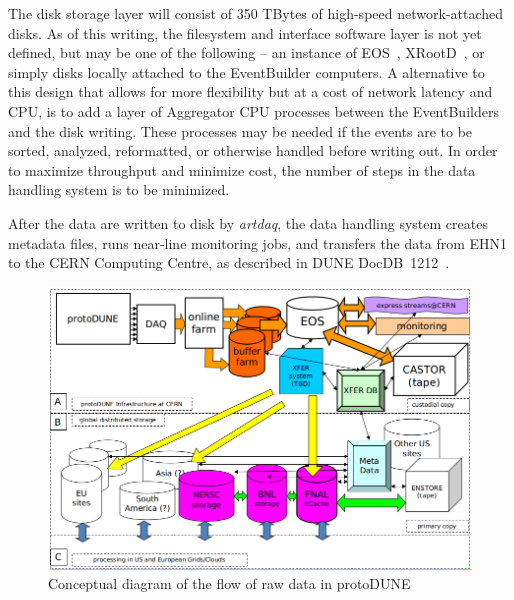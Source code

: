 The disk storage layer will consist of 350 TBytes of high-speed
network-attached disks.  As of this writing, the filesystem and
interface software layer is not yet defined, but may be one of the
following -- an instance of EOS~\cite{eos}, XRootD~\cite{xrootd}, or
simply disks locally attached to the EventBuilder computers.  A
alternative to this design that allows for more flexibility but at a
cost of network latency and CPU, is to add a layer of Aggregator CPU
processes between the EventBuilders and the disk writing.  These
processes may be needed if the events are to be sorted, analyzed,
reformatted, or otherwise handled before writing out.  In order to
maximize throughput and minimize cost, the number of steps in the data
handling system is to be minimized.

After the data are written to disk by {\it artdaq}, the data handling
system creates metadata files, runs near-line monitoring jobs, and
transfers the data from EHN1 to the CERN Computing Centre, as
described in DUNE DocDB~1212~\cite{docdb1212}.

\begin{figure}[tbh]
\centering
\includegraphics[width=\linewidth]{figures/protoDUNE_raw_data_concept.png}
\caption{\label{fig:raw_concept}Conceptual diagram of the flow of raw data in protoDUNE}
\end{figure}

